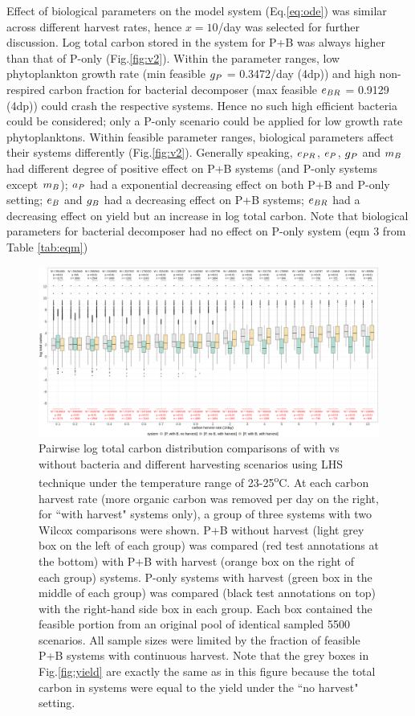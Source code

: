 \documentclass[../thesis.tex]{subfiles} %
\begin{document}
Effect of biological parameters on the model system (Eq.\ref{eq:ode}) was similar across different harvest rates, hence $x=10$/day was selected for further discussion.  Log total carbon stored in the system for P+B was always higher than that of P-only (Fig.\ref{fig:v2}).  Within the parameter ranges, low phytoplankton growth rate (min feasible $g_P$ = 0.3472/day (4dp)) and high non-respired carbon fraction for bacterial decomposer (max feasible $e_{BR}$ = 0.9129 (4dp)) could crash the respective systems.  Hence no such high efficient bacteria could be considered; only a P-only scenario could be applied for low growth rate phytoplanktons.  Within feasible parameter ranges, biological parameters affect their systems differently (Fig.\ref{fig:v2}).  Generally speaking, $e_{PR}$, $e_P$, $g_P$ and $m_B$ had different degree of positive effect on P+B systems (and P-only systems except $m_B$); $a_P$ had a exponential decreasing effect on both P+B and P-only setting; $e_B$ and $g_B$ had a decreasing effect on P+B systems; $e_{BR}$ had a decreasing effect on yield but an increase in log total carbon.  Note that biological parameters for bacterial decomposer had no effect on P-only system (eqm 3 from Table \ref{tab:eqm})

\begin{figure}[H]
    \centering
    \includegraphics[width=\linewidth]{../result/totC.png}
    \caption[Pairwise log total carbon]{Pairwise log total carbon distribution comparisons of with vs without bacteria and different harvesting scenarios using LHS technique under the temperature range of 23-25\textsuperscript{o}C.  {\scriptsize At each carbon harvest rate (more organic carbon was removed per day on the right, for ``with harvest" systems only), a group of three systems with two Wilcox comparisons were shown.  P+B without harvest (light grey box on the left of each group) was compared (red test annotations at the bottom) with P+B with harvest (orange box on the right of each group) systems.  P-only systems with harvest (green box in the middle of each group) was compared (black test annotations on top) with the right-hand side box in each group.  Each box contained the feasible portion from an original pool of identical sampled 5500 scenarios.  All sample sizes were limited by the fraction of feasible P+B systems with continuous harvest.  Note that the grey boxes in Fig.\ref{fig:yield} are exactly the same as in this figure because the total carbon in systems were equal to the yield under the ``no harvest" setting.}}
    \label{fig:totC}
\end{figure}
\end{document}
